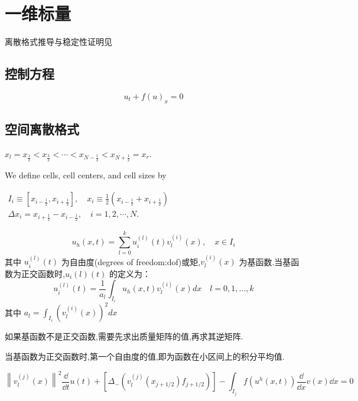 \documentclass{book}
\begin{document}
\section{一维标量}
离散格式推导与稳定性证明见\cite{RN16}
\subsection{控制方程}
\begin{equation}
  u_t+f(u)_x = 0
\end{equation}
\subsection{空间离散格式}

$x_{l}=x_{\frac{1}{2}}<x_{\frac{3}{2}}<\cdots<x_{N-\frac{1}{2}}<x_{N+\frac{1}{2}}=x_{r} .$

We define cells, cell centers, and cell sizes by

$\begin{array}{l}
    I_{i} \equiv\left[x_{i-\frac{1}{2}}, x_{i+\frac{1}{2}}\right], \quad x_{i} \equiv \frac{1}{2}\left(x_{i-\frac{1}{2}}+x_{i+\frac{1}{2}}\right) \\
    \Delta x_{i}=x_{i+\frac{1}{2}}-x_{i-\frac{1}{2}}, \quad i=1,2, \cdots, N .
  \end{array}$

\begin{equation}
  u_{h}(x, t)=\sum_{l=0}^{k} u_{i}^{(l)}(t) v_{l}^{(i)}(x), \quad x \in I_{i}
\end{equation}
其中 $u_i^{(l)}(t)$ 为自由度(degrees of freedom:dof)或矩,$v_l^{(i)}(x)$ 为基函数.当基函数为正交函数时,$u_i{(l)}(t)$ 的定义为：
\begin{equation}
  u_{i}^{(l)}(t)=\frac{1}{a_{l}} \int_{I_{i}} u_{h}(x, t) v_{l}^{(i)}(x) d x \quad l=0,1, \ldots, k
\end{equation}
其中 $a_{l}=\int_{I_{i}}\left(v_{l}^{(i)}(x)\right)^{2} d x$
\begin{remark}
  如果基函数不是正交函数,需要先求出质量矩阵的值,再求其逆矩阵.
\end{remark}
\begin{remark}
  当基函数为正交函数时,第一个自由度的值,即为函数在小区间上的积分平均值.
\end{remark}
\begin{equation}
  \left\|v_{l}^{(j)}(x)\right\|^{2} \dfrac{\dd}{\dd t} u(t)+\left[\Delta_{-}\left(v_{l}^{(j)}\left(x_{j+1 / 2}\right) f_{j+1 / 2}\right)\right]-\int_{I_{j}} f\left(u^{h}(x, t)\right) \dfrac{\dd}{\dd x} v(x) \dd x=0
\end{equation}
\end{document}
